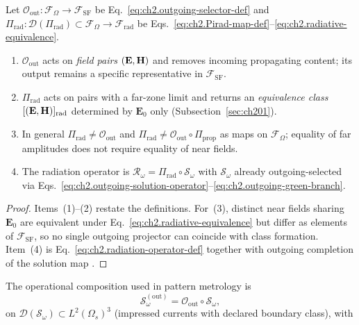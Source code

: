 \begin{proposition}
\label{prop:ch2.Pirad-vs-Oout}
Let $\mathcal{O}_{\mathrm{out}}:\mathcal{F}_\Omega\to\mathcal{F}_{\mathrm{SF}}$ be Eq.~\eqref{eq:ch2.outgoing-selector-def} and
$\Pi_{\mathrm{rad}}:\mathcal{D}(\Pi_{\mathrm{rad}})\subset\mathcal{F}_\Omega\to\mathcal{F}_{\mathrm{rad}}$ be Eqs.~\eqref{eq:ch2.Pirad-map-def}--\eqref{eq:ch2.radiative-equivalence}.
\begin{enumerate}
\item $\mathcal{O}_{\mathrm{out}}$ acts on \emph{field pairs} $(\mathbf{E},\mathbf{H})$ and removes incoming propagating content; its output remains a specific representative in $\mathcal{F}_{\mathrm{SF}}$.
\item $\Pi_{\mathrm{rad}}$ acts on pairs with a far-zone limit and returns an \emph{equivalence class} $[(\mathbf{E},\mathbf{H})]_{\mathrm{rad}}$ determined by $\mathbf{E}_0$ only (Subsection~\ref{sec:ch201}).
\item In general $\Pi_{\mathrm{rad}}\neq\mathcal{O}_{\mathrm{out}}$ and $\Pi_{\mathrm{rad}}\neq\mathcal{O}_{\mathrm{out}}\circ\Pi_{\mathrm{prop}}$ as maps on $\mathcal{F}_\Omega$; equality of far amplitudes does not require equality of near fields.
\item The radiation operator is $\mathcal{R}_\omega=\Pi_{\mathrm{rad}}\circ\mathcal{S}_\omega$ with $\mathcal{S}_\omega$ already outgoing-selected via Eqs.~\eqref{eq:ch2.outgoing-solution-operator}--\eqref{eq:ch2.outgoing-green-branch}.
\end{enumerate}
\end{proposition}
\begin{proof}
Items~(1)--(2) restate the definitions. For~(3), distinct near fields sharing $\mathbf{E}_0$ are equivalent under Eq.~\eqref{eq:ch2.radiative-equivalence} but differ as elements of $\mathcal{F}_{\mathrm{SF}}$, so no single outgoing projector can coincide with class formation. Item~(4) is Eq.~\eqref{eq:ch2.radiation-operator-def} together with outgoing completion of the solution map \cite{stratton1941,sommerfeld1949}.
\end{proof}
The operational composition used in pattern metrology is
\begin{equation}
\label{eq:ch2.outgoing-radiation-refinement}
\mathcal{S}_\omega^{\mathrm{(out)}}
=
\mathcal{O}_{\mathrm{out}}\circ\mathcal{S}_\omega,
\end{equation}
on $\mathcal{D}(\mathcal{S}_\omega)\subset L^{2}(\Omega_s)^{3}$ (impressed currents with declared boundary class), with
